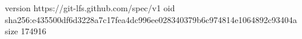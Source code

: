 version https://git-lfs.github.com/spec/v1
oid sha256:e435500df6d3228a7c17fea4dc996ee028340379b6c974814e1064892c93404a
size 174916
